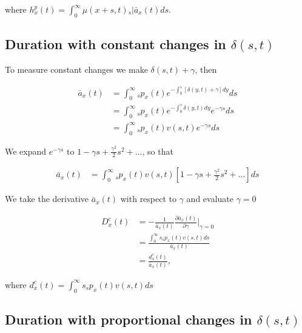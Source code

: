 \documentclass[12pt]{article}
\begin{document}
where ${h}^{p}_{x}(t)=\int_0^\infty \mu(x+s,t)   {}_s|\bar{a}_x(t) ds$.



\subsection{Duration with constant changes in $\delta(s,t)$}\label{sec:DurConst}

To measure constant changes we make $\delta(s,t)+\gamma$, then

\begin{equation}\label{eq:DurationConst1}
\begin{split}
\bar{a}_{x}(t) &= \int_0^\infty {}_sp_x(t) e^{- \int_{0}^{s} [\delta(y,t)+\gamma]dy}ds \\
&= \int_0^\infty {}_sp_x(t) e^{- \int_{0}^{s}\delta(y,t)dy}e^{-\gamma s}ds \\
&= \int_0^\infty {}_sp_x(t) {v}(s,t)e^{-\gamma s}ds
\end{split}
\end{equation}

We expand $e^{-\gamma s}$ to $1-\gamma s+\frac{\gamma^2}{2} s^{2} +...$, so that


\begin{equation}\label{eq:DurationConst1}
\begin{split}
\bar{a}_{x}(t) &= \int_0^\infty {}_sp_x(t) {v}(s,t)[1-\gamma s+\frac{\gamma^2}{2} s^{2} +...]ds
\end{split}
\end{equation}

We take the derivative $\bar{a}_{x}(t)$ with respect to $\gamma$ and evaluate $\gamma=0$


\begin{equation}\label{eq:DurationConst2}
\begin{split}
{D}^{c}_x(t)&=-\frac{1}{\bar{a}_x(t)}\frac{\partial \bar{a}_x(t)}{\partial \gamma} \bigg\rvert_{\gamma=0}\\
              &= \frac{\int_0^\infty s {}_sp_x(t) {v}(s,t)ds}{\bar{a}_x(t)} \\
              &= \frac{{d}^{c}_x(t)}{\bar{a}_x(t)},
\end{split}
\end{equation}

where ${d}^{c}_x(t)=\int_0^\infty s {}_sp_x(t) {v}(s,t)ds$



\subsection{Duration with proportional changes in $\delta(s,t)$} \label{sec:DurProp}
\end{document}
